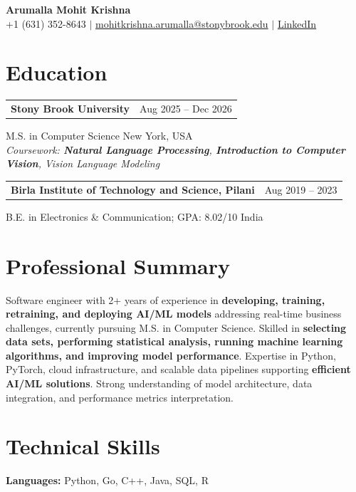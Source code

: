 \documentclass[letterpaper,10pt]{article}
\makeatletter
\newcommand{\entry}[2]{%
  \noindent
  \begin{tabularx}{\linewidth}
    {@{}>{\raggedright\arraybackslash}X@{\hspace{6pt}}r@{}}
    \textbf{#1} & #2
  \end{tabularx}\par
}
\makeatother
\begin{document}
\begin{center}
    {\LARGE\bfseries Arumalla Mohit Krishna}\\[3pt]
    +1 (631) 352-8643 $|$
    \href{mailto:mohitkrishna.arumalla@stonybrook.edu}
    {mohitkrishna.arumalla@stonybrook.edu} $|$
    \href{https://linkedin.com/in/mohit-krishna-arumalla}
    {LinkedIn}
\end{center}
\vspace{-8pt}

\section{Education}

\entry
  {\textbf{Stony Brook University}}
  {Aug 2025 -- Dec 2026}

M.S. in Computer Science \hfill New York, USA\\
\textit{
Coursework: \textbf{Natural Language Processing}, \textbf{Introduction to Computer Vision}, Vision Language Modeling
}
\vspace{3pt}

\entry
  {\textbf{Birla Institute of Technology and Science, Pilani}}
  {Aug 2019 -- 2023}

B.E. in Electronics \& Communication; GPA: 8.02/10 \hfill India

\section{Professional Summary}

Software engineer with 2+ years of experience in \textbf{developing, training, retraining, and deploying AI/ML models} addressing real-time business challenges, currently pursuing M.S. in Computer Science. Skilled in \textbf{selecting data sets, performing statistical analysis, running machine learning algorithms, and improving model performance}. Expertise in Python, PyTorch, cloud infrastructure, and scalable data pipelines supporting \textbf{efficient AI/ML solutions}. Strong understanding of model architecture, data integration, and performance metrics interpretation.

\section{Technical Skills}

\textbf{Languages:}
Python, Go, C++, Java, SQL, R\\
\end{document}
